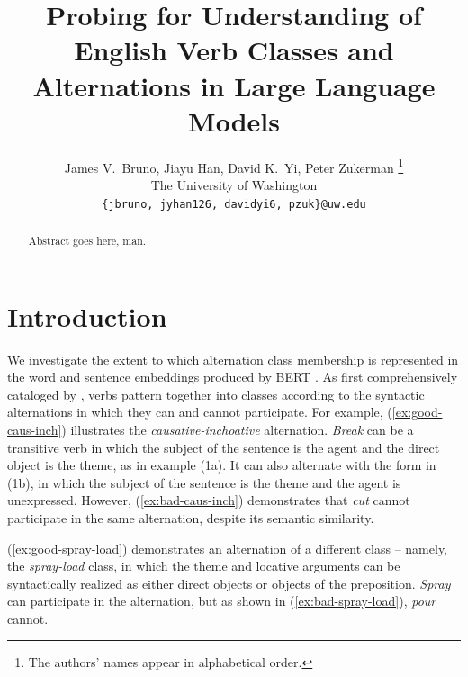 \documentclass[11pt]{article}
\title{Probing for Understanding of English Verb Classes and Alternations in Large Language Models}
\author{James V.~Bruno, Jiayu Han, David K.~Yi, Peter Zukerman \thanks{ The authors' names appear in alphabetical order.}\\
The University of Washington\\
  \texttt{\{jbruno, jyhan126, davidyi6, pzuk\}@uw.edu}}
\begin{document}
\maketitle
\begin{abstract}
Abstract goes here, man.
\end{abstract}

\section{Introduction}
We investigate the extent to which alternation class membership is represented in the word and sentence embeddings produced by BERT \citep{bertpaper}.  As first comprehensively cataloged by \citet{levin1993}, verbs pattern together into classes according to the syntactic alternations in which they can and cannot participate.  For example, (\ref{ex:good-caus-inch}) illustrates the \emph{causative-inchoative} alternation.  \emph{Break} can be a transitive verb in which the subject of the sentence is the agent and the direct object is the theme, as in example (1a).  It can also alternate with the form in (1b), in which the subject of the sentence is the theme and the agent is unexpressed. %
However, (\ref{ex:bad-caus-inch}) demonstrates that \emph{cut} cannot participate in the same alternation, despite its semantic similarity.

\begin{exe}
    \ex
        \label{ex:good-caus-inch}
        \begin{xlist}
        \end{xlist}

    \ex
        \label{ex:bad-caus-inch}
        \begin{xlist}
        \end{xlist}
\end{exe}

(\ref{ex:good-spray-load}) demonstrates an alternation of a different class -- namely, the \emph{spray-load} class, in which the theme and locative arguments can be syntactically realized as either direct objects or objects of the preposition.  \emph{Spray} can participate in the alternation, but as shown in (\ref{ex:bad-spray-load}), \emph{pour} cannot.

\begin{exe}
    \ex 
        \label{ex:good-spray-load}
        \begin{xlist}
        \end{xlist}

    \ex 
        \label{ex:bad-spray-load}
        \begin{xlist}
        \end{xlist}
\end{exe}
\end{document}
